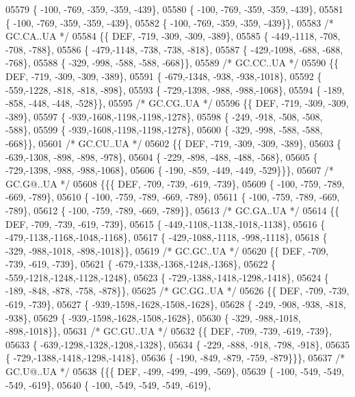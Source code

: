 \begin{DoxyCode}
05579 \{ -100, -769, -359, -359, -439\},
05580 \{ -100, -769, -359, -359, -439\},
05581 \{ -100, -769, -359, -359, -439\},
05582 \{ -100, -769, -359, -359, -439\}\},
05583 \textcolor{comment}{/* GC.CA..UA */}
05584 \{\{  DEF, -719, -309, -309, -389\},
05585 \{ -449,-1118, -708, -708, -788\},
05586 \{ -479,-1148, -738, -738, -818\},
05587 \{ -429,-1098, -688, -688, -768\},
05588 \{ -329, -998, -588, -588, -668\}\},
05589 \textcolor{comment}{/* GC.CC..UA */}
05590 \{\{  DEF, -719, -309, -309, -389\},
05591 \{ -679,-1348, -938, -938,-1018\},
05592 \{ -559,-1228, -818, -818, -898\},
05593 \{ -729,-1398, -988, -988,-1068\},
05594 \{ -189, -858, -448, -448, -528\}\},
05595 \textcolor{comment}{/* GC.CG..UA */}
05596 \{\{  DEF, -719, -309, -309, -389\},
05597 \{ -939,-1608,-1198,-1198,-1278\},
05598 \{ -249, -918, -508, -508, -588\},
05599 \{ -939,-1608,-1198,-1198,-1278\},
05600 \{ -329, -998, -588, -588, -668\}\},
05601 \textcolor{comment}{/* GC.CU..UA */}
05602 \{\{  DEF, -719, -309, -309, -389\},
05603 \{ -639,-1308, -898, -898, -978\},
05604 \{ -229, -898, -488, -488, -568\},
05605 \{ -729,-1398, -988, -988,-1068\},
05606 \{ -190, -859, -449, -449, -529\}\}\},
05607 \textcolor{comment}{/* GC.G@..UA */}
05608 \{\{\{  DEF, -709, -739, -619, -739\},
05609 \{ -100, -759, -789, -669, -789\},
05610 \{ -100, -759, -789, -669, -789\},
05611 \{ -100, -759, -789, -669, -789\},
05612 \{ -100, -759, -789, -669, -789\}\},
05613 \textcolor{comment}{/* GC.GA..UA */}
05614 \{\{  DEF, -709, -739, -619, -739\},
05615 \{ -449,-1108,-1138,-1018,-1138\},
05616 \{ -479,-1138,-1168,-1048,-1168\},
05617 \{ -429,-1088,-1118, -998,-1118\},
05618 \{ -329, -988,-1018, -898,-1018\}\},
05619 \textcolor{comment}{/* GC.GC..UA */}
05620 \{\{  DEF, -709, -739, -619, -739\},
05621 \{ -679,-1338,-1368,-1248,-1368\},
05622 \{ -559,-1218,-1248,-1128,-1248\},
05623 \{ -729,-1388,-1418,-1298,-1418\},
05624 \{ -189, -848, -878, -758, -878\}\},
05625 \textcolor{comment}{/* GC.GG..UA */}
05626 \{\{  DEF, -709, -739, -619, -739\},
05627 \{ -939,-1598,-1628,-1508,-1628\},
05628 \{ -249, -908, -938, -818, -938\},
05629 \{ -939,-1598,-1628,-1508,-1628\},
05630 \{ -329, -988,-1018, -898,-1018\}\},
05631 \textcolor{comment}{/* GC.GU..UA */}
05632 \{\{  DEF, -709, -739, -619, -739\},
05633 \{ -639,-1298,-1328,-1208,-1328\},
05634 \{ -229, -888, -918, -798, -918\},
05635 \{ -729,-1388,-1418,-1298,-1418\},
05636 \{ -190, -849, -879, -759, -879\}\}\},
05637 \textcolor{comment}{/* GC.U@..UA */}
05638 \{\{\{  DEF, -499, -499, -499, -569\},
05639 \{ -100, -549, -549, -549, -619\},
05640 \{ -100, -549, -549, -549, -619\},

\end{DoxyCode}
